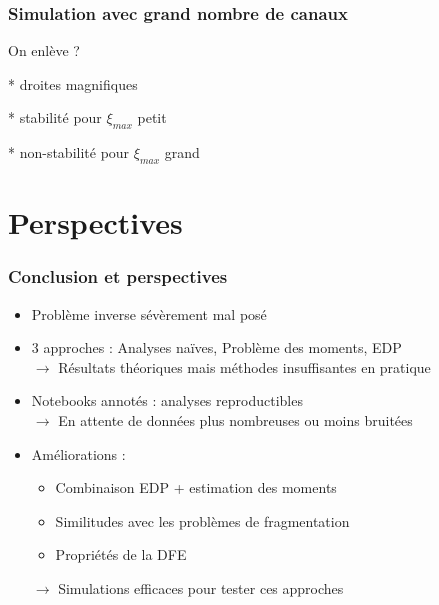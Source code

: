 \documentclass{beamer}
\begin{document}
\begin{frame}[allowframebreaks]
  \frametitle{Simulation avec grand nombre de canaux}
  On enlève ?
  
  * droites magnifiques

  * stabilité pour $\xi_{max}$ petit

  * non-stabilité pour $\xi_{max}$ grand
\end{frame}


\section*{Perspectives}

\begin{frame}
  \frametitle{Conclusion et perspectives}
  \begin{itemize}[label=$\bullet$]
    \item Problème inverse sévèrement mal posé
    \vspace{3mm}
    \item 3 approches : Analyses naïves, Problème des moments, EDP \\
    $\to$ Résultats théoriques mais méthodes insuffisantes en pratique
    \vspace{3mm}
    \item Notebooks annotés : analyses reproductibles\\
    $\to$ En attente de données plus nombreuses ou moins bruitées
    \vspace{3mm}
    \item Améliorations :
    \begin{itemize}[label=$\star$]
    	\item Combinaison EDP + estimation des moments
	\item Similitudes avec les problèmes de fragmentation
	\item Propriétés de la DFE
    \end{itemize}
    $\to$ Simulations efficaces pour tester ces approches
  \end{itemize}
\end{frame}
\end{document}
